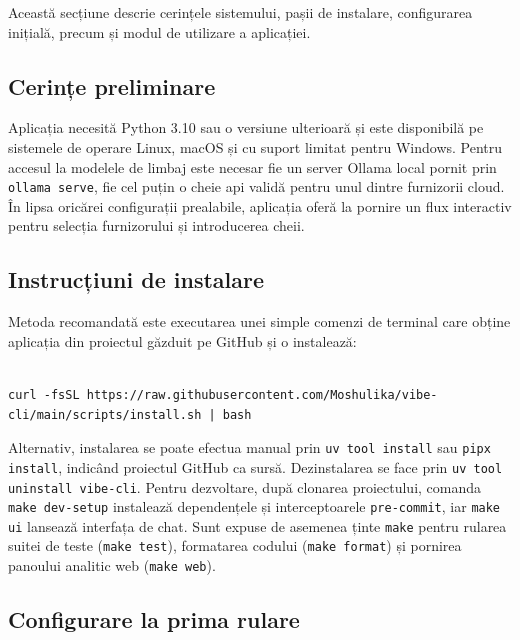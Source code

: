 \documentclass[12pt, a4paper, oneside, romanian]{teza-upb}
\begin{document}
  Această secțiune descrie cerințele sistemului, pașii de instalare, configurarea inițială, precum și modul de utilizare a aplicației.

    \subsection{Cerințe preliminare}

    Aplicația necesită Python 3.10 sau o versiune ulterioară și este disponibilă pe sistemele de operare Linux, macOS și cu suport limitat pentru Windows. Pentru accesul la modelele de limbaj este necesar fie un server Ollama local pornit prin \texttt{ollama serve},
    fie cel puțin o cheie \ac{api} validă pentru unul dintre furnizorii cloud. În lipsa oricărei configurații prealabile, aplicația oferă la pornire un flux interactiv pentru selecția furnizorului și introducerea cheii.

    \subsection{Instrucțiuni de instalare} 

    Metoda recomandată este executarea unei simple comenzi de terminal care obține aplicația din proiectul găzduit pe GitHub și o instalează:

    \begin{lstlisting}[basicstyle=\ttfamily\small,breaklines=true,breakatwhitespace=false,frame=none,numbers=none,xleftmargin=0em,aboveskip=0.3em,belowskip=0.3em]

curl -fsSL https://raw.githubusercontent.com/Moshulika/vibe-cli/main/scripts/install.sh | bash
    \end{lstlisting}

    Alternativ, instalarea se poate efectua manual prin \texttt{uv tool install} sau \texttt{pipx install}, indicând proiectul GitHub ca sursă. Dezinstalarea se face prin \texttt{uv tool uninstall vibe-cli}. Pentru dezvoltare, după clonarea proiectului, comanda \texttt{make dev-setup} instalează dependențele
    și interceptoarele \texttt{pre-commit}, iar \texttt{make ui} lansează interfața de chat. Sunt expuse de asemenea ținte \texttt{make} pentru rularea suitei de teste (\texttt{make test}), formatarea codului (\texttt{make format}) și pornirea panoului analitic web (\texttt{make web}).

    \subsection{Configurare la prima rulare}
\end{document}

